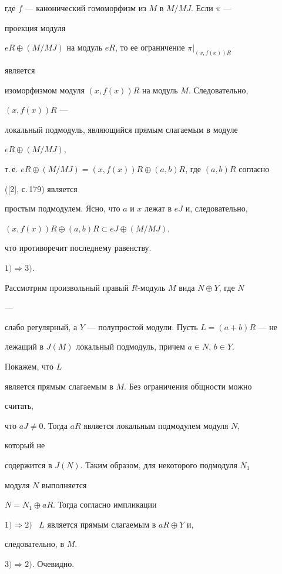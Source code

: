 где $f$ --- канонический гомоморфизм из $M$ в $M/MJ$. Если $\pi$ --- 


проекция модуля 


$eR\oplus(M/MJ)$ на модуль $eR$, то ее ограничение $\pi|_{(x,f(x))R}$ 


является 


изоморфизмом модуля $(x,f(x))R$ на модуль $M$. Следовательно, 


$(x,f(x))R$ --- 


локальный подмодуль, являющийся прямым слагаемым в модуле 


$eR\oplus(M/MJ)$, 


т.\,е. $eR\oplus(M/MJ)=(x,f(x))R\oplus (a,b)R$, где $(a,b)R$ согласно 


([2], с.\,179) является 


простым подмодулем. Ясно, что $a$ и $x$ лежат в $eJ$ и, следовательно, 


$(x,f(x))R\oplus (a,b)R\subset eJ\oplus(M/MJ)$, 


что противоречит последнему равенству. 


 


$1)\Rightarrow 3)$. 


Рассмотрим произвольный правый $R$-модуль $M$ вида $N\oplus Y$, где $N$ 


--- 


слабо регулярный, а $Y$ --- полупростой модули. Пусть $L=(a+b)R$ --- не 


лежащий в $J(M)$ локальный подмодуль, причем $a\in N$, $b\in Y$. 


Покажем, что $L$ 


является прямым слагаемым в $M$. Без ограничения общности можно 


считать, 


что $aJ\ne0$. Тогда $aR$ является локальным подмодулем модуля $N$, 


который не 


содержится в $J(N)$. Таким образом, для некоторого подмодуля $N_1$ 


модуля $N$ выполняется


 $N=N_1\oplus aR$. Тогда согласно импликации 


$1)\Rightarrow 2)$ \ $L$ является прямым слагаемым в $aR\oplus Y$ и, 


следовательно, в $M$. 


 


$3)\Rightarrow 2)$. Очевидно. 


